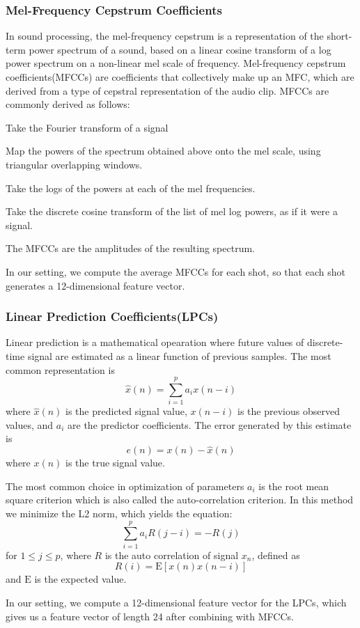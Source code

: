 \subsubsection{Mel-Frequency Cepstrum Coefficients}
In sound processing, the mel-frequency cepstrum is a representation of the short-term power spectrum of a sound, based on a linear cosine transform of a log power spectrum on a non-linear mel scale of frequency. Mel-frequency cepstrum coefficients(MFCCs) are coefficients that collectively make up an MFC, which are derived from a type of cepstral representation of the audio clip. MFCCs are commonly derived as follows:
\begin{enumeration}
\item Take the Fourier transform of a signal
\item Map the powers of the spectrum obtained above onto the mel scale, using triangular overlapping windows.
\item Take the logs of the powers at each of the mel frequencies.
\item Take the discrete cosine transform of the list of mel log powers, as if it were a signal.
\item The MFCCs are the amplitudes of the resulting spectrum.
\end{enumeration}
In our setting, we compute the average MFCCs for each shot, so that each shot generates a 12-dimensional feature vector.
\subsubsection{Linear Prediction Coefficients(LPCs)}
Linear prediction is a mathematical opearation where future values of discrete-time signal are estimated as a linear function of previous samples. The most common representation is 
$$ \hat{x}(n) = \sum_{i=1}^{p} a_i x(n-i)$$
where $\hat{x}(n)$ is the predicted signal value, $x(n-i)$ is the previous observed values, and $a_i$ are the predictor coefficients. The error generated by this estimate is 
$$ e(n) = x(n) - \hat{x}(n)$$
where $x(n)$ is the true signal value. \par
The most common choice in optimization of parameters $a_i$ is the root mean square criterion which is also called the auto-correlation criterion. In this method we minimize the L2 norm, which yields the equation:
$$\sum_{i=1}^{p} a_i R(j-i) = -R(j)$$
for $1 \leq j \leq p$, where $R$ is the auto correlation of signal $x_n$, defined as
$$R(i) = \mathrm{E}[x(n)x(n-i)]$$
and $\mathrm{E}$ is the expected value.\par
In our setting, we compute a 12-dimensional feature vector for the LPCs, which gives us a feature vector of length 24 after combining with MFCCs.

